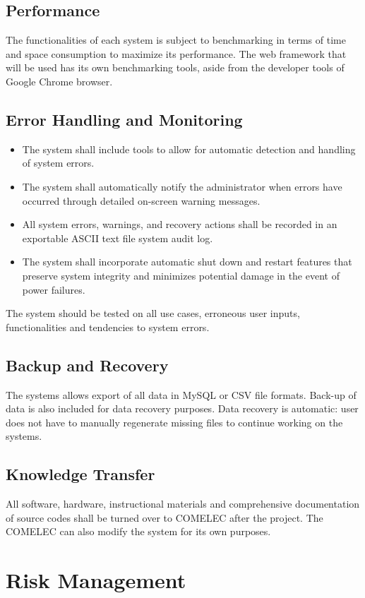 \documentclass[a4paper, 11pt]{article}
\begin{document}
\subsection{Performance}
The functionalities of each system is subject to benchmarking in terms of time and space consumption to maximize its performance.
The web framework that will be used has its own benchmarking tools, aside from the developer tools of Google Chrome browser.

\subsection{Error Handling and Monitoring}
\begin{itemize}
	\item The system shall include tools to allow for automatic detection and handling of system errors.
	\item The system shall automatically notify the administrator when errors have occurred through detailed on-screen warning messages.
	\item All system errors, warnings, and recovery actions shall be recorded in an exportable ASCII text file system audit log.
	\item The system shall incorporate automatic shut down and restart features that preserve system integrity and minimizes potential damage in the event of power failures.
\end{itemize}
The system should be tested on all use cases, erroneous user inputs, functionalities and tendencies to system errors.

\subsection{Backup and Recovery}
The systems allows export of all data in MySQL or CSV file formats. Back-up of data is also included for data recovery purposes. Data recovery is automatic: user does not have to manually regenerate missing files to continue working on the systems.

\subsection{Knowledge Transfer}
All software, hardware, instructional materials and comprehensive documentation of source codes shall be turned over to COMELEC after the project. The COMELEC can also modify the system for its own purposes.

\section{Risk Management}
\end{document}
